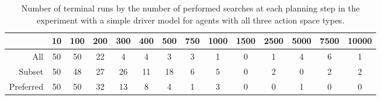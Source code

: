 \begin{table}[htbp]
\footnotesize
\setlength{\tabcolsep}{4pt}
\centering
\centerfloat
\begin{tabular}{@{}rccccccccccccc@{}}
\toprule
                    & 10 & 100 & 200 & 300 & 400 & 500 & 750 & 1000 & 1500 & 2500 & 5000 & 7500 & 10000 \\ \midrule
All       & 50 & 50  & 22  & 4   & 4   & 3   & 3   & 1    & 0    & 1    & 4    & 6    & 1     \\
Subset     & 50 & 48  & 27  & 26  & 11  & 18  & 6   & 5    & 0    & 2    & 0    & 2    & 2     \\
Preferred & 50 & 50  & 32  & 13  & 8   & 4   & 1   & 3    & 0    & 0    & 1    & 0    & 0     \\ \bottomrule
\end{tabular}
\caption[Number of terminal runs by the number of performed searches]{Number of terminal runs by the number of performed searches at each planning step in the experiment with a simple driver model for agents with all three action space types.}
\label{tab:simple_terminal}
\end{table}